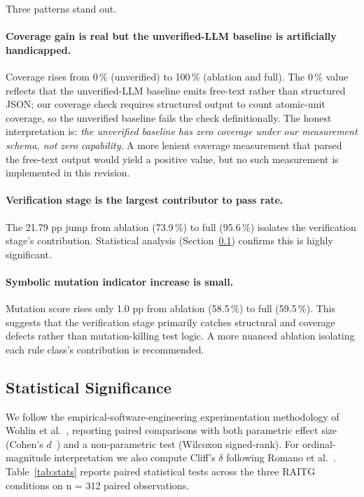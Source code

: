 \documentclass[10pt,twocolumn,letterpaper]{article}
\begin{document}
Three patterns stand out.

\paragraph{Coverage gain is real but the unverified-LLM baseline is
artificially handicapped.}
Coverage rises from 0\,\% (unverified) to 100\,\% (ablation and
full). The 0\,\% value reflects that the unverified-LLM baseline
emits free-text rather than structured JSON; our coverage check
requires structured output to count atomic-unit coverage, so the
unverified baseline fails the check definitionally. The honest
interpretation is: \emph{the unverified baseline has zero coverage
under our measurement schema, not zero capability}. A more lenient
coverage measurement that parsed the free-text output would yield a
positive value, but no such measurement is implemented in this
revision.

\paragraph{Verification stage is the largest contributor to pass
rate.}
The 21.79 pp jump from ablation (73.9\,\%) to full (95.6\,\%)
isolates the verification stage's contribution. Statistical analysis
(Section~\ref{sec:stats}) confirms this is highly significant.

\paragraph{Symbolic mutation indicator increase is small.}
Mutation score rises only 1.0 pp from ablation (58.5\,\%) to full
(59.5\,\%). This suggests that the verification stage primarily
catches structural and coverage defects rather than mutation-killing
test logic. A more nuanced ablation isolating each rule class's
contribution is recommended.

\subsection{Statistical Significance}
\label{sec:stats}

We follow the empirical-software-engineering experimentation
methodology of Wohlin et al.~\citep{wohlin2012experimentation},
reporting paired comparisons with both parametric effect size
(Cohen's $d$~\citep{cohen1988power}) and a non-parametric test
(Wilcoxon signed-rank). For ordinal-magnitude interpretation we also
compute Cliff's $\delta$ following Romano et
al.~\citep{romano2006cliff}. Table~\ref{tab:stats} reports paired
statistical tests across the three RAITG conditions on n = 312
paired observations.
\end{document}
